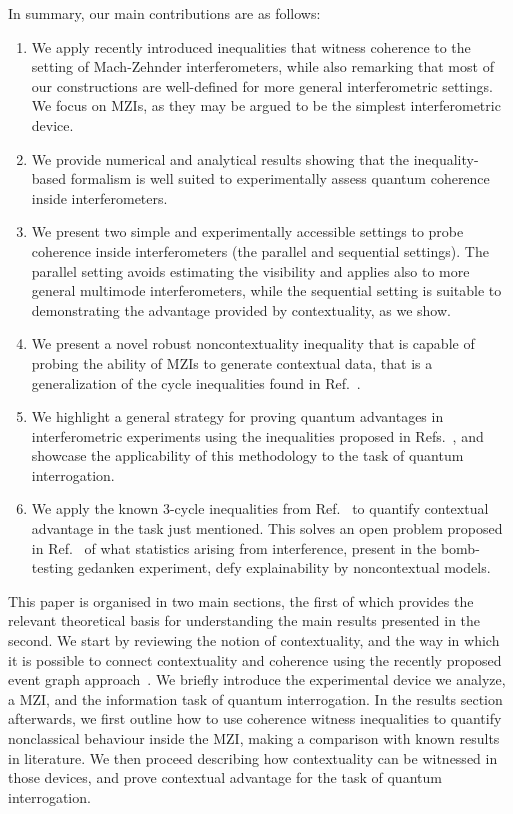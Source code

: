 \documentclass[a4paper,twocolumn,11pt,accepted=2024-01-17]{quantumarticle}
\begin{document}
{In summary, our main contributions are as follows: 
\begin{enumerate}
    \item We apply recently introduced inequalities that witness coherence  to the setting of Mach-Zehnder interferometers, while also remarking that most of our constructions are well-defined for more general interferometric settings. We focus on MZIs, as they may be argued to be the simplest interferometric device.
    \item We provide numerical and analytical results showing that the inequality-based formalism is well suited to experimentally assess quantum coherence inside interferometers.
    \item We present two simple and experimentally accessible settings to probe coherence inside interferometers (the parallel and sequential settings). The parallel setting avoids estimating the visibility and applies also to more general multimode interferometers, while the sequential setting is  suitable to demonstrating the advantage provided by contextuality, as we show. 
    \item We present a novel robust noncontextuality inequality that is capable of probing the ability of MZIs to generate contextual data, that is a generalization of the cycle inequalities found in Ref.~\cite{galvaobroad2020quantumandclassical}. %
    \item We highlight a general strategy for proving quantum advantages in interferometric experiments using the inequalities proposed in Refs.~\cite{galvaobroad2020quantumandclassical,wagner2022inequalities}, and showcase the applicability of this methodology to the task of quantum interrogation.
    \item We apply the known $3$-cycle inequalities from Ref.~\cite{galvaobroad2020quantumandclassical} to quantify contextual advantage in the task just mentioned. This solves an open problem proposed in Ref.~\cite{catani2021interference} of what statistics arising from interference, present in the bomb-testing gedanken experiment, defy explainability by noncontextual models. 
\end{enumerate}
}



This paper is organised in two main sections, the first of which provides the relevant theoretical basis for understanding the main results presented in the second. We start by reviewing the notion of contextuality, and the way in which it is possible to connect contextuality and coherence using the recently proposed event graph approach~\cite{wagner2022inequalities}. We briefly introduce the experimental device we analyze, a MZI, and the information task of quantum interrogation. In the results section afterwards, we first outline how to use coherence witness inequalities to quantify nonclassical behaviour inside the MZI, making a comparison with known results in literature. We then proceed describing how contextuality can be witnessed in those devices, and prove contextual advantage for the task of quantum interrogation.
\end{document}
